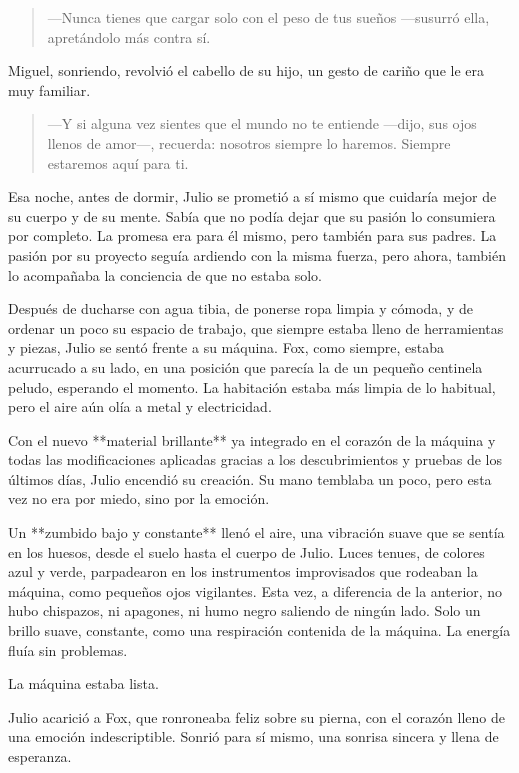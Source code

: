 \documentclass[a4paper,12pt]{book}
\begin{document}
\begin{quote}
    —Nunca tienes que cargar solo con el peso de tus sueños —susurró ella, apretándolo más contra sí.
\end{quote}

Miguel, sonriendo, revolvió el cabello de su hijo, un gesto de cariño que le era muy familiar.

\begin{quote}
    —Y si alguna vez sientes que el mundo no te entiende —dijo, sus ojos llenos de amor—, recuerda: nosotros siempre lo haremos. Siempre estaremos aquí para ti.
\end{quote}

Esa noche, antes de dormir, Julio se prometió a sí mismo que cuidaría mejor de su cuerpo y de su mente. Sabía que no podía dejar que su pasión lo consumiera por completo. La promesa era para él mismo, pero también para sus padres. La pasión por su proyecto seguía ardiendo con la misma fuerza, pero ahora, también lo acompañaba la conciencia de que no estaba solo.

Después de ducharse con agua tibia, de ponerse ropa limpia y cómoda, y de ordenar un poco su espacio de trabajo, que siempre estaba lleno de herramientas y piezas, Julio se sentó frente a su máquina. Fox, como siempre, estaba acurrucado a su lado, en una posición que parecía la de un pequeño centinela peludo, esperando el momento. La habitación estaba más limpia de lo habitual, pero el aire aún olía a metal y electricidad.

Con el nuevo **material brillante** ya integrado en el corazón de la máquina y todas las modificaciones aplicadas gracias a los descubrimientos y pruebas de los últimos días, Julio encendió su creación. Su mano temblaba un poco, pero esta vez no era por miedo, sino por la emoción.

Un **zumbido bajo y constante** llenó el aire, una vibración suave que se sentía en los huesos, desde el suelo hasta el cuerpo de Julio. Luces tenues, de colores azul y verde, parpadearon en los instrumentos improvisados que rodeaban la máquina, como pequeños ojos vigilantes. Esta vez, a diferencia de la anterior, no hubo chispazos, ni apagones, ni humo negro saliendo de ningún lado. Solo un brillo suave, constante, como una respiración contenida de la máquina. La energía fluía sin problemas.

La máquina estaba lista.

Julio acarició a Fox, que ronroneaba feliz sobre su pierna, con el corazón lleno de una emoción indescriptible. Sonrió para sí mismo, una sonrisa sincera y llena de esperanza.
\end{document}
